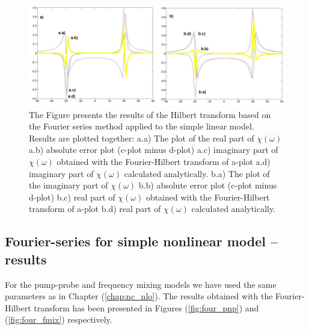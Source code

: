 \documentclass[12pt,twoside,a4paper]{article}
\numberwithin{equation}{subsection}
\numberwithin{figure}{subsection}
\begin{document}
\begin{figure} 
  \includegraphics[width=150mm]{img/four_lin.png}
  \caption{ The Figure presents the results of the Hilbert transform based on the Fourier series method applied to the simple linear model. Results are plotted together:
   a.a) The plot of the real part of $\chi (\omega )$ 
   a.b) absolute error plot (c-plot minus d-plot) 
   a.c) imaginary part of $\chi (\omega )$ obtained with the Fourier-Hilbert transform of a-plot 
   a.d) imaginary part of $\chi (\omega )$  calculated analytically. 
   b.a) The plot of the imaginary part of $\chi (\omega )$ 
   b.b) absolute error plot (c-plot minus d-plot) 
   b.c) real part of $\chi (\omega )$ obtained with the Fourier-Hilbert transform of a-plot 
   b.d) real part of $\chi (\omega )$ calculated analytically. \label{fig:four_lin}
  }
\end{figure} 

\subsection{Fourier-series for simple nonlinear model -- results} \label{chap:fourier_nlo}

For the pump-probe and frequency mixing models we have used the same parameters as in Chapter (\ref{chap:nc_nlo}). The results obtained with the Fourier-Hilbert transform has been presented in Figures (\ref{fig:four_pnp}) and (\ref{fig:four_fmix}) respectively.
\end{document}
